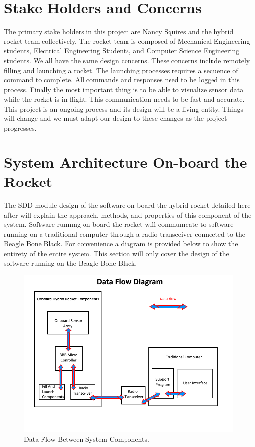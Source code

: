 \documentclass[10pt,draftclsnofoot,onecolumn,compsoc]{IEEEtran}
\begin{document}
\section{Stake Holders and Concerns}
The primary stake holders in this project are Nancy Squires and the hybrid rocket team collectively. The rocket team is composed of Mechanical Engineering students, Electrical Engineering Students, and Computer Science Engineering students. We all have the same design concerns. These concerns include remotely filling and launching a rocket. The launching processes requires a sequence of command to complete. All commands and responses need to be logged in this process. Finally the most important thing is to be able to visualize sensor data while the rocket is in flight. This communication needs to be fast and accurate. This project is an ongoing process and its design will be a living entity. Things will change and we must adapt our design to these changes as the project progresses.
\section{System Architecture On-board the Rocket }	
The SDD module design of the software on-board the hybrid rocket detailed here after will explain the approach, methods, and properties of this component of the system. Software running on-board the rocket will communicate to software running on a traditional computer through a radio transceiver connected to the Beagle Bone Black. For convenience a diagram is provided below to show the entirety of the entire system. This section will  only cover the design of the software running on the Beagle Bone Black. \par

\begin{figure}[!ht]
  \caption{Data Flow Between System Components.}
  \centering
	\includegraphics[scale=.85]{RocketBlockDiagram}
\end{figure}
\FloatBarrier
\end{document}
